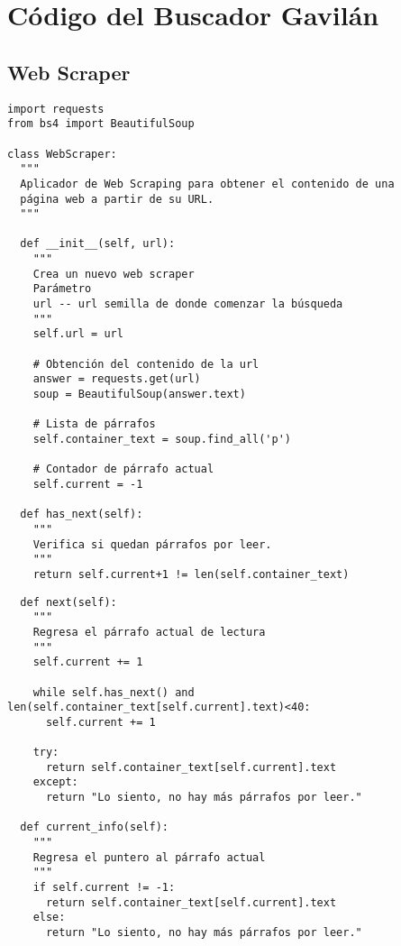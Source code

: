 
\chapter{Código del Buscador Gavilán}
\label{Anexo1}


\section{Web Scraper}
\label{A1Anexo}

\begin{tcolorbox}[colback=white!25!white,colframe=blue]
  \begin{verbatim}
import requests
from bs4 import BeautifulSoup

class WebScraper:
  """
  Aplicador de Web Scraping para obtener el contenido de una 
  página web a partir de su URL.
  """

  def __init__(self, url):
    """
    Crea un nuevo web scraper
    Parámetro
    url -- url semilla de donde comenzar la búsqueda
    """
    self.url = url

    # Obtención del contenido de la url
    answer = requests.get(url)
    soup = BeautifulSoup(answer.text)

    # Lista de párrafos
    self.container_text = soup.find_all('p')

    # Contador de párrafo actual
    self.current = -1
    
  def has_next(self):
    """
    Verifica si quedan párrafos por leer.
    """
    return self.current+1 != len(self.container_text)
  \end{verbatim}
\end{tcolorbox}

\begin{tcolorbox}[colback=white!25!white,colframe=blue]
  \begin{verbatim}
  def next(self):
    """
    Regresa el párrafo actual de lectura
    """
    self.current += 1
        
    while self.has_next() and len(self.container_text[self.current].text)<40:
      self.current += 1
        
    try:
      return self.container_text[self.current].text 
    except:
      return "Lo siento, no hay más párrafos por leer."
    
  def current_info(self):
    """
    Regresa el puntero al párrafo actual
    """
    if self.current != -1:
      return self.container_text[self.current].text
    else:
      return "Lo siento, no hay más párrafos por leer."
  \end{verbatim}
\end{tcolorbox}

